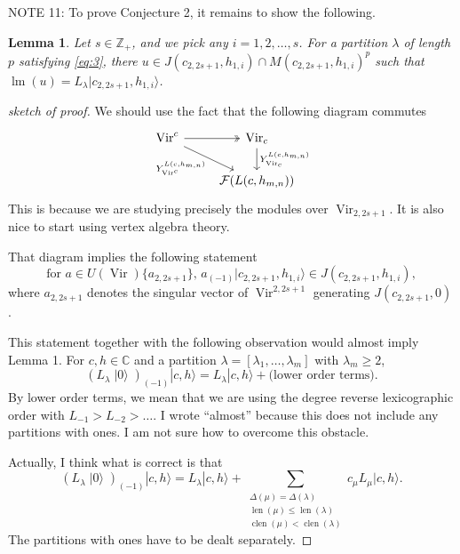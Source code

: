 \documentclass[a4paper, 12pt, reqno]{amsart}
\newtheorem{lemma}[theorem]{Lemma}
\theoremstyle{remark}
\DeclareMathOperator{\Vir}{Vir}
\DeclareMathOperator{\len}{len}
\DeclareMathOperator{\clen}{clen}
\DeclareMathOperator{\vac}{|0\rangle}
\DeclareMathOperator{\lm}{lm}
\begin{document}
NOTE 11: To prove Conjecture 2, it remains to show the following.
\begin{lemma}
  \label{lmm:2}
  Let $s \in \mathbb{Z}_+$, and we pick any $i = 1, 2, \dots, s$.
  For a partition $\lambda$ of length $p$ satisfying \eqref{eq:3}, there $u \in J(c_{2, 2s + 1}, h_{1, i}) \cap M(c_{2, 2s + 1}, h_{1, i})^p$ such that $\lm(u) = L_{\lambda}|c_{2, 2s + 1}, h_{1, i}\rangle$.
\end{lemma}

\begin{proof}[sketch of proof]
  We should use the fact that the following diagram commutes
  \begin{equation*}
    \begin{tikzcd}
      \Vir^c \arrow[r, two heads] \arrow[rd, "{Y^{L(c, h_{m, n})}_{\Vir^c}}"'] & {\Vir_c} \arrow[d, "{Y^{L(c, h_{m, n})}_{\Vir_c}}"] \\
      & {\mathcal{F}(L(c, h_{m, n}))}
    \end{tikzcd}
  \end{equation*}
  This is because we are studying precisely the modules over $\Vir_{2, 2s + 1}$.
  It is also nice to start using vertex algebra theory.

  That diagram implies the following statement
  \begin{equation*}
    \text{for $a \in U(\Vir)\{a_{2, 2s + 1}\}$, $a_{(-1)}|c_{2, 2s + 1}, h_{1, i}\rangle \in J(c_{2, 2s + 1}, h_{1, i})$},
  \end{equation*}
  where $a_{2, 2s + 1}$ denotes the singular vector of $\Vir^{2, 2s + 1}$ generating $J(c_{2, 2s + 1}, 0)$.

  This statement together with the following observation would almost imply Lemma 1.
  For $c, h \in \mathbb{C}$ and a partition $\lambda = [\lambda_1, \dots, \lambda_m]$ with $\lambda_m \ge 2$,
  \begin{equation*}
    (L_{\lambda}\vac)_{(-1)}|c, h\rangle = L_{\lambda}|c, h\rangle + \text{(lower order terms)}.
  \end{equation*}
  By lower order terms, we mean that we are using the degree reverse lexicographic order with $L_{-1} > L_{-2} > \dots$.
  I wrote ``almost'' because this does not include any partitions with ones.
  I am not sure how to overcome this obstacle.

  Actually, I think what is correct is that
  \begin{equation*}
    (L_{\lambda}\vac)_{(-1)}|c, h\rangle = L_{\lambda}|c, h\rangle + \sum_{\substack{\Delta(\mu) = \Delta(\lambda) \\ \len(\mu) \le \len(\lambda) \\ \clen(\mu) < \clen(\lambda)}}c_{\mu}L_{\mu}|c, h\rangle.
  \end{equation*}
  The partitions with ones have to be dealt separately.
\end{proof}
\end{document}
